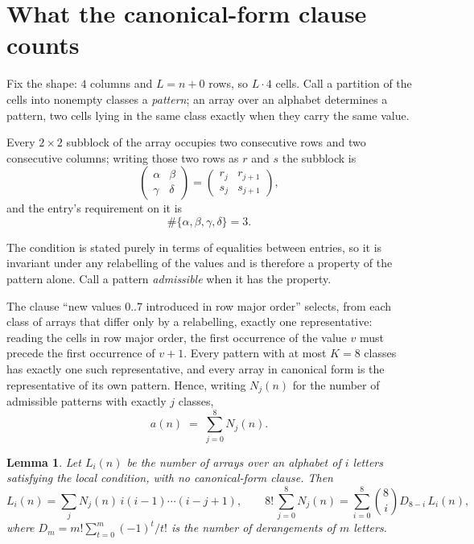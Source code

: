 \documentclass[11pt,a4paper]{article}
\theoremstyle{plain}
\newtheorem{lemma}[theorem]{Lemma}
\theoremstyle{definition}
\begin{document}
\section{What the canonical-form clause counts}

Fix the shape: $4$ columns and $L=n+0$ rows, so $L\cdot4$ cells. Call a
partition of the cells into nonempty classes a \emph{pattern}; an array over an alphabet
determines a pattern, two cells lying in the same class exactly when they carry the same
value.

Every $2\times2$ subblock of the array occupies two consecutive
rows and two consecutive columns; writing those two rows as $r$ and $s$ the
subblock is
\[
\begin{pmatrix}\alpha&\beta\\\gamma&\delta\end{pmatrix}=\begin{pmatrix}r_j&r_{j+1}\\s_j&s_{j+1}\end{pmatrix},
\]
and the entry's requirement on it is
\begin{equation}\label{eq:loc}
\#\{\alpha,\beta,\gamma,\delta\}=3.
\end{equation}

The condition is stated purely in terms of equalities between entries, so it is invariant
under any relabelling of the values and is therefore a property of the pattern alone. Call a
pattern \emph{admissible} when it has the property.

The clause ``new values $0..7$ introduced in row major order'' selects, from each class
of arrays that differ only by a relabelling, exactly one representative: reading the cells in
row major order, the first occurrence of the value $v$ must precede the first occurrence of
$v+1$. Every pattern with at most $K=8$ classes has exactly one such representative, and
every array in canonical form is the representative of its own pattern. Hence, writing
$N_j(n)$ for the number of admissible patterns with exactly $j$ classes,
\begin{equation}\label{eq:apat}
a(n)\;=\;\sum_{j=0}^{8}N_j(n).
\end{equation}

\begin{lemma}\label{lem:inv}
Let $L_i(n)$ be the number of arrays over an alphabet of $i$ letters satisfying the local
condition, with no canonical-form clause. Then
\[
L_i(n)=\sum_j N_j(n)\,i(i-1)\cdots(i-j+1),
\qquad
8!\,\sum_{j=0}^{8}N_j(n)=\sum_{i=0}^{8}\binom{8}{i}D_{8-i}\,L_i(n),
\]
where $D_m=m!\sum_{t=0}^{m}(-1)^t/t!$ is the number of derangements of $m$ letters.
\end{lemma}
\end{document}
